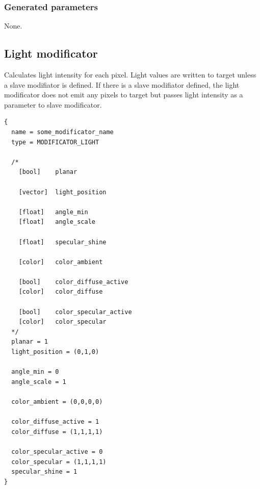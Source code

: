 \documentclass[9pt]{article}
\begin{document}
\subsubsection*{Generated parameters}

None.

\subsection{Light modificator}

Calculates light intensity for each pixel. Light values are written to target 
unless a slave modifiator is defined. If there is a slave modifiator defined, the
light modificator does not emit any pixels to target but passes light intensity as 
a parameter to slave modificator.

\begin{verbatim}
{
  name = some_modificator_name
  type = MODIFICATOR_LIGHT

  /*      
    [bool]    planar
      
    [vector]  light_position
      
    [float]   angle_min
    [float]   angle_scale
      
    [float]   specular_shine
      
    [color]   color_ambient
      
    [bool]    color_diffuse_active
    [color]   color_diffuse
      
    [bool]    color_specular_active
    [color]   color_specular
  */
  planar = 1
  light_position = (0,1,0)
  
  angle_min = 0
  angle_scale = 1
  
  color_ambient = (0,0,0,0)
  
  color_diffuse_active = 1
  color_diffuse = (1,1,1,1)
  
  color_specular_active = 0
  color_specular = (1,1,1,1)
  specular_shine = 1
}
\end{verbatim}
\end{document}
